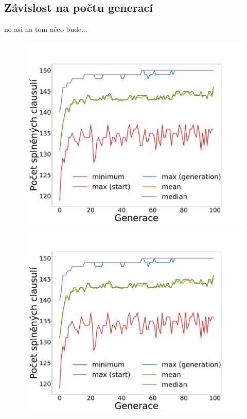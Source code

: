 \documentclass[11pt]{article}
\begin{document}
\subsection{Závislost na počtu generací}
no asi na tom něco bude...


\begin{figure}
	\centering
    \begin{minipage}[c]{0.325\textwidth}
        \centering\includegraphics[width=\textwidth]{img/1c.pdf} 
    \end{minipage}
    \begin{minipage}[c]{0.325\textwidth}
        \centering \includegraphics[width=\textwidth]{img/1c.pdf} 

\end{minipage}
\end{figure}
\end{document}
